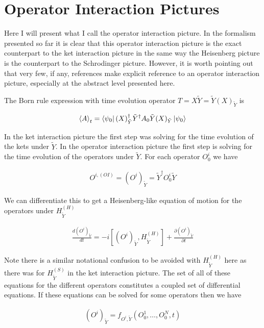 \documentclass[12pt]{article}
\begin{document}
\section{Operator Interaction Pictures}

Here I will present what I call the operator interaction picture.
In the formalism presented so far it is clear that this operator interaction picture is the exact counterpart to the ket interaction picture in the same way the Heisenberg picture is the counterpart to the Schrodinger picture.
However, it is worth pointing out that very few, if any, references make explicit reference to an operator interaction picture, especially at the abstract level presented here.

The Born rule expression with time evolution operator $T=X\tilde{Y} = \tilde{Y}(X)_{\tilde{Y}}$ is

\begin{align}
\braket{A}_t = \bra{\psi_0}(X)_{\tilde{Y}}^{\dag} \tilde{Y}^{\dag} A_0 \tilde{Y} (X)_{\tilde{Y}}\ket{\psi_0}
\end{align}

In the ket interaction picture the first step was solving for the time evolution of the kets under $\tilde{Y}$. 
In the operator interaction picture the first step is solving for the time evolution of the operators under $\tilde{Y}$.
For each operator $O^i_0$ we have

\begin{align}
O^{i, (OI)} = \left(O^i\right)_{\tilde{Y}} = \tilde{Y}^{\dag}O^i_0\tilde{Y}
\end{align}

We can differentiate this to get a Heisenberg-like equation of motion for the operators under $H_{\tilde{Y}}^{(H)}$

\begin{align}
\frac{d\left(O^i\right)_{\tilde{Y}}}{dt} = -i\left[\left(O^i\right)_{\tilde{Y}}, H_{\tilde{Y}}^{(H)}\right] + \frac{\partial \left(O^i\right)_{\tilde{Y}}}{\partial t}
\end{align}

Note there is a similar notational confusion to be avoided with $H_{\tilde{Y}}^{(H)}$ here as there was for $H_{\tilde{Y}}^{(S)}$ in the ket interaction picture.
The set of all of these equations for the different operators constitutes a coupled set of differential equations.
If these equations can be solved for some operators then we have

\begin{align}
\left(O^i\right)_{\tilde{Y}} = f_{O^i, \tilde{Y}}\left(O^1_0, \ldots, O^N_0, t\right)
\end{align}
\end{document}
